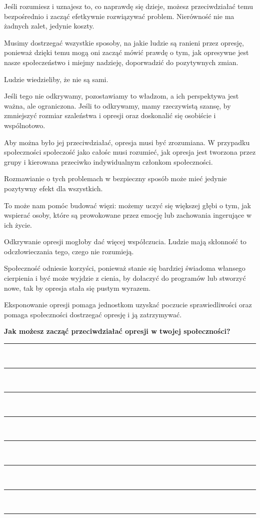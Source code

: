 \begin{checkboxlist}
	\item Jeśli rozumiesz i uznajesz to, co naprawdę się dzieje, możesz przeciwdziałać temu bezpośrednio i zacząć efetkywnie rozwiązywać problem. Nierówność nie ma żadnych zalet, jedynie koszty.
	\item Musimy dostrzegać wszystkie sposoby, na jakie ludzie są ranieni przez opresję, ponieważ dzięki temu mogą oni zacząć mówić prawdę o tym, jak opresywne jest nasze społeczeństwo i miejmy nadzieję, doporwadzić do pozytywnych zmian.
	\item Ludzie wiedzieliby, że nie są sami.
	\item Jeśli tego nie odkrywamy, pozostawiamy to władzom, a ich perspektywa jest ważna, ale ograniczona. Jeśli to odkrywamy, mamy rzeczywistą szansę, by zmniejszyć rozmiar szaleństwa i opresji oraz doskonalić się osobiście i wspólnotowo.
	\item Aby można było jej przeciwdziałać, opresja musi być zrozumiana. W przypadku społeczności społeczość jako całośc musi rozumieć, jak opresja jest tworzona przez grupy i kierowana przeciwko indywidualnym członkom społeczności.
	\item Rozmawianie o tych problemach w bezpieczny sposób może mieć jedynie pozytywny efekt dla wszystkich.
	\item To może nam pomóc budować więzi: możemy uczyć się większej głębi o tym, jak wspierać osoby, które są prowokowane przez emocję lub zachowania ingerujące w ich życie.
	\item Odkrywanie opresji mogłoby dać więcej współczucia. Ludzie mają skłonność to odczłowieczania tego, czego nie rozumieją.
	\item Społeczność odniesie korzyści, ponieważ stanie się bardziej świadoma włansego cierpienia i być może wyjdzie z cienia, by dołaczyć do programów lub stworzyć nowe, tak by opresja stała się pustym wyrazem.
	\item Eksponowanie opresji pomaga jednostkom uzyskać poczucie sprawiedliwości oraz pomaga społeczności dostrzegać opresję i ją zatrzymywać.
\end{checkboxlist}

\noindent\textcolor{ProcessBlue}{\textbf{\LARGE{Jak możesz zacząć przeciwdziałać opresji w twojej społeczności?}}}\\

\noindent\rule{\textwidth}{1pt}\\
\noindent\rule{\textwidth}{1pt}\\
\noindent\rule{\textwidth}{1pt}\\
\noindent\rule{\textwidth}{1pt}\\
\noindent\rule{\textwidth}{1pt}\\
\noindent\rule{\textwidth}{1pt}\\
\noindent\rule{\textwidth}{1pt}\\
\noindent\rule{\textwidth}{1pt}\\\\



